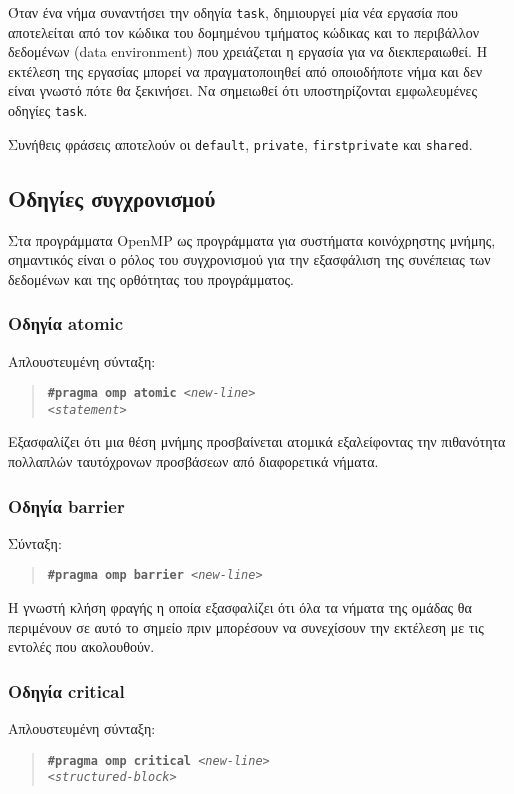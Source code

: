 Όταν ένα νήμα συναντήσει την οδηγία \texttt{task}, δημιουργεί μία νέα εργασία που αποτελείται από τον κώδικα του δομημένου τμήματος κώδικας και το περιβάλλον δεδομένων (data environment) που χρειάζεται η εργασία για να διεκπεραιωθεί. Η εκτέλεση της εργασίας μπορεί να πραγματοποιηθεί από οποιοδήποτε νήμα και δεν είναι γνωστό πότε θα ξεκινήσει. Να σημειωθεί ότι υποστηρίζονται εμφωλευμένες οδηγίες \texttt{task}.

Συνήθεις φράσεις αποτελούν οι \texttt{default}, \texttt{private}, \texttt{firstprivate} και \texttt{shared}.


\subsection{Οδηγίες συγχρονισμού}
Στα προγράμματα OpenMP ως προγράμματα για συστήματα κοινόχρηστης μνήμης, σημαντικός είναι ο ρόλος του συγχρονισμού για την εξασφάλιση της συνέπειας των δεδομένων και της ορθότητας του προγράμματος.

\subsubsection{Οδηγία atomic}
Απλουστευμένη σύνταξη:
\begin{quote}
	\texttt{\textbf{\#pragma omp atomic} \textit{<new-line>}} \\
		\texttt{\textit{<statement>}}
\end{quote}

Εξασφαλίζει ότι μια θέση μνήμης προσβαίνεται ατομικά εξαλείφοντας την πιθανότητα πολλαπλών ταυτόχρονων προσβάσεων από διαφορετικά νήματα.

\subsubsection{Οδηγία barrier}
Σύνταξη:
\begin{quote}
	\texttt{\textbf{\#pragma omp barrier} \textit{<new-line>}}
\end{quote}

Η γνωστή κλήση φραγής η οποία εξασφαλίζει ότι όλα τα νήματα της ομάδας θα περιμένουν σε αυτό το σημείο πριν μπορέσουν να συνεχίσουν την εκτέλεση με τις εντολές που ακολουθούν.

\subsubsection{Οδηγία critical}
Απλουστευμένη σύνταξη:
\begin{quote}
	\texttt{\textbf{\#pragma omp critical} \textit{<new-line>}} \\
		\texttt{\textit{<structured-block>}}
\end{quote}

